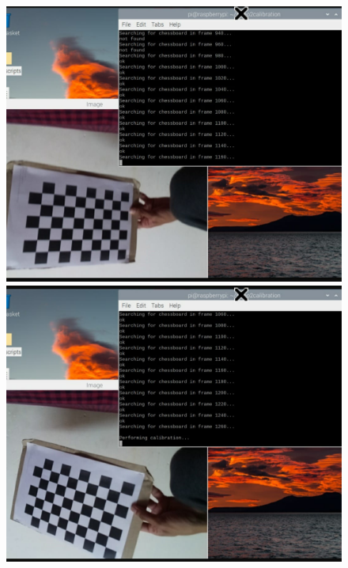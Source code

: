 \documentclass{article}
\begin{document}
\begin{figure}[!htb]
              \includegraphics[width=\linewidth]{./figs/images/img1.jpeg}
            \endminipage\hfill
              \includegraphics[width=\linewidth]{./figs/images/img2.jpeg}
            \endminipage\hfill

\end{figure}
\end{document}
